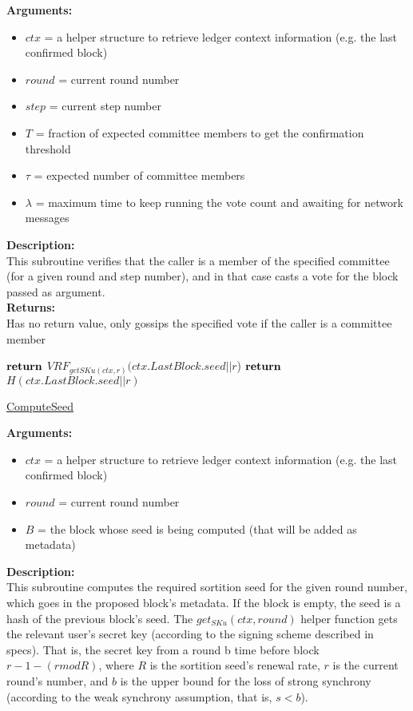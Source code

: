 \documentclass[10pt,a4paper]{article}
\begin{document}
\noindent \textbf{Arguments:}
\begin{itemize}
    \item $ctx$ = a helper structure to retrieve ledger context information (e.g. the last confirmed block)
    \item $round$ = current round number
    \item $step$ = current step number
    \item $T$ = fraction of expected committee members to get the confirmation threshold
    \item $\tau$ = expected number of committee members
    \item $\lambda$ = maximum time to keep running the vote count and awaiting for network messages
  \end{itemize}

\noindent \textbf{Description:}\\
This subroutine verifies that the caller is a member of the specified committee (for a given round and step number), 
and in that case casts a vote for the block passed as argument.\\

\noindent \textbf{Returns:}\\
Has no return value, only gossips the specified vote if the caller is a committee member


\begin{algorithm}[H]
    \begin{algorithmic}[H]
            \State $\Return$ $VRF_{getSKu(ctx, r)}(ctx.LastBlock.seed||r$)
        \Else
            \State $\Return$ $H(ctx.LastBlock.seed||r)$
        \EndIf
    \EndFunction
    \end{algorithmic}
    \caption{\underline{ComputeSeed}}
\end{algorithm}


\noindent \textbf{Arguments:}
\begin{itemize}
    \item $ctx$ = a helper structure to retrieve ledger context information (e.g. the last confirmed block)
    \item $round$ = current round number
    \item $B$ = the block whose seed is being computed (that will be added as metadata)
  \end{itemize}


\noindent \textbf{Description:}\\
This subroutine computes the required sortition seed for the given round number, which goes in the proposed block's metadata.
If the block is empty, the seed is a hash of the previous block's seed.
The $get_{SKu}(ctx, round)$ helper function gets the relevant user's secret key (according to the signing scheme described in specs).
That is, the secret key from a round b time before block $r-1-(r mod R)$, where $R$ is the sortition seed's renewal rate, $r$ is the current round's number,
and $b$ is the upper bound for the loss of strong synchrony (according to the weak synchrony assumption, that is, $s < b$).\\
\end{document}
